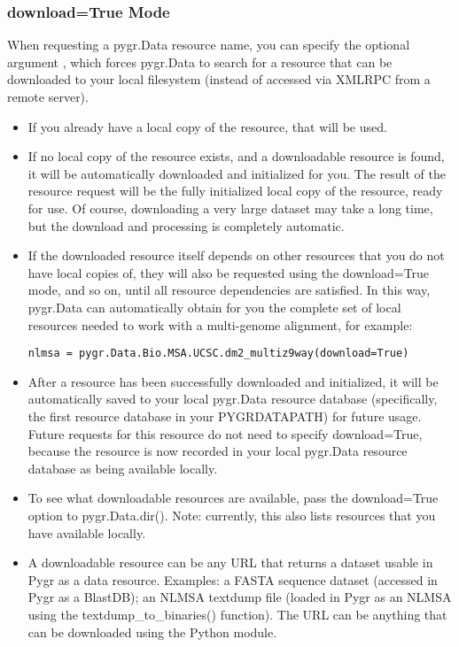 \documentclass{howto}
\begin{document}
\subsubsection{download=True Mode}
When requesting a pygr.Data resource name, you can specify 
the optional argument , which forces pygr.Data
to search for a resource that can be downloaded to your local
filesystem (instead of accessed via XMLRPC from a remote server).
\begin{itemize}
\item If you already have a local copy of the resource, that will be used.

\item If no local copy of the resource exists, and a downloadable
resource is found, it will be automatically downloaded and initialized
for you.  The result of the resource request will be the fully
initialized local copy of the resource, ready for use.  Of course,
downloading a very large dataset may take a long time, but
the download and processing is completely automatic.

\item If the downloaded resource itself depends on other 
resources that you do not have local copies of, they will also
be requested using the download=True mode, and so on, until
all resource dependencies are satisfied.  In this way, pygr.Data
can automatically obtain for you the complete set of local 
resources needed to work with a multi-genome alignment, for example:
\begin{verbatim}
nlmsa = pygr.Data.Bio.MSA.UCSC.dm2_multiz9way(download=True)
\end{verbatim}

\item After a resource has been successfully downloaded and
initialized, it will be automatically saved to your local pygr.Data resource
database (specifically, the first resource database in your
PYGRDATAPATH) for future usage.  Future requests for this
resource do not need to specify download=True, because the 
resource is now recorded in your local pygr.Data resource database
as being available locally.

\item To see what downloadable resources are available, pass the
download=True option to pygr.Data.dir().  Note: currently, this 
also lists resources that you have available locally.

\item A downloadable resource can be any URL that returns
a dataset usable in Pygr as a data resource.  Examples:
a FASTA sequence dataset (accessed in Pygr as a BlastDB);
an NLMSA textdump file (loaded in Pygr as an NLMSA using the
textdump_to_binaries() function).  The URL can be anything 
that can be downloaded using the Python 
module.


\end{itemize}
\end{document}
